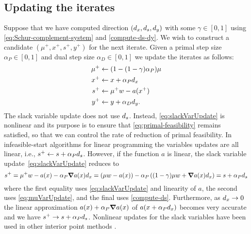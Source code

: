 \documentclass{article}
\begin{document}





\subsection{Updating the iterates}\label{sec:update-iterates}

Suppose that we have computed direction $(d_{x}, d_{s}, d_{y})$ with some $\gamma \in [0,1]$ using \eqref{eq:Schur-complement-system} and \eqref{compute-ds-dy}. We wish to construct a candidate $(\mu^{+}, x^{+}, s^{+}, y^{+})$ for the next iterate.
Given a primal step size $\alpha_{P} \in [0,1]$ and dual step size $\alpha_{D} \in [0,1]$ we update the iterates as follows:
\begin{subequations}\label{eq:iterate-update}
\begin{flalign}
\mu^{+} &\gets (1 - (1 - \gamma) \alpha_{P}) \mu \label{eq:muVarUpdate} \\
x^{+} &\gets x + \alpha_{P} d_{x} \label{eq:xVarUpdate} \\
s^{+} &\gets \mu^{+} w - a(x^{+}) \label{eq:slackVarUpdate} \\ 
y^{+} &\gets y + \alpha_{D} d_{y}. \label{eq:update-y} 
\end{flalign}
\end{subequations}
The slack variable update does not use $d_{s}$. Instead, \eqref{eq:slackVarUpdate} is nonlinear and its purpose is to ensure that \eqref{eq:primal-feasibility} remains satisfied, so that we can control the rate of reduction of primal feasibility. In infeasible-start algorithms for linear programming \cite{lustig1990feasibility,mehrotra1992implementation} the variables updates are all linear, i.e., $s^{+} \gets s + \alpha_{P} d_{s}$. However, if the function $a$ is linear, the slack variable update~\eqref{eq:slackVarUpdate} reduces to
$$
s^{+} = \mu^{+} w - a(x) - \alpha_{P} \grad a(x)  d_{x} = \left(\mu w - a(x) \right) -  \alpha_{P}  \left( (1 - \gamma) \mu w + \grad a(x)  d_{x} \right) = s + \alpha_{P} d_{s}
$$
where the first equality uses \eqref{eq:slackVarUpdate} and linearity of $a$, the second uses \eqref{eq:muVarUpdate}, and the final uses \eqref{compute-ds}. Furthermore, as $d_{x} \rightarrow 0$ the linear approximation $a(x) + \alpha_{P} \grad a(x)$ of $a(x + \alpha_{P} d_{x})$ becomes very accurate and we have $s^{+} \rightarrow  s + \alpha_{P} d_{s}$. Nonlinear updates for the slack variables have been used in other interior point methods \cite{andersen1998computational, curtis2012penalty}.
\end{document}
